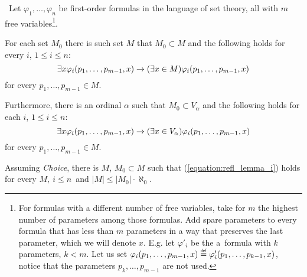 
\begin{lemma}\label{lemma:reflection_lemma}\
Let $\varphi_1, \ldots, \varphi_n$ be first-order formulas in the language of set theory, all with $m$ free variables\footnote{For formulas with a different number of free variables, take for $m$ the highest number of parameters among those formulas. Add spare parameters to every formula that has less than $m$ parameters in a way that preserves the last parameter, which we will denote $x$. E.g. let $\varphi'_i$ be the a~formula with $k$ parameters, $k < m$. Let us set $\varphi_i(p_1, \ldots, p_{m-1}, x) \defeq \varphi'_i(p_1, \ldots, p_{k-1}, x)$, notice that the parameters $p_k, \ldots, p_{m-1}$ are not used.}.
\bce[(i)]
\item For each set $M_0$ there is such set $M$ that $M_0 \subset M$ and the following holds for every $i$, $1 \leq i \leq n$:
\begin{equation}\label{equation:refl_lemma_i}
\exists x \varphi_i(p_1, \ldots, p_{m-1}, x) \rightarrow (\exists x \in M) \varphi_i(p_1, \ldots, p_{m-1}, x)
\end{equation}
for every $p_1, \ldots, p_{m-1} \in M$.

\item Furthermore, there is an ordinal $\alpha$ such that $M_0 \subset V_\alpha$ and the following holds for each $i$, $1 \leq i \leq n$:
\begin{equation}\label{equation:refl_lemma_ii}
\exists x \varphi_i(p_1, \ldots, p_{m-1}, x) \rightarrow (\exists x \in V_\alpha) \varphi_i(p_1, \ldots, p_{m-1}, x)
\end{equation}
for every $p_1, \ldots, p_{m-1} \in M$.

\item Assuming \emph{Choice}, there is $M$, $M_0 \subset M$ such that (\ref{equation:refl_lemma_i}) holds for every $M,\ i \leq n$ and $|M| \leq |M_0| \cdot \aleph_0$.
\ece
\end{lemma}

